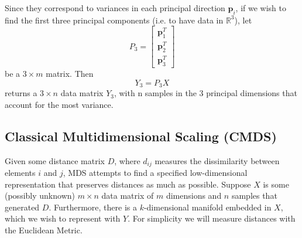 \documentclass[11pt]{article}
\begin{document}
\begin{multicols}{2}
Since they correspond to variances in each principal direction $\mathbf{p}_i$, if we wish to find the first three principal components (i.e. to have data in $\mathbb{R}^3$), let
\[P_3 = \begin{bmatrix} \mathbf{p}_1^T \\[0.5em] \mathbf{p}_2^T \\[0.5em] \mathbf{p}_3^T \end{bmatrix}\]
be a $3 \times m$ matrix. Then
\[Y_3 = P_3X\]
returns a $3 \times n$ data matrix $Y_3$, with n samples in the 3 principal dimensions that account for the most variance.

\subsection*{Classical Multidimensional Scaling (CMDS)}

Given some distance matrix $D$, where $d_{ij}$ measures the dissimilarity between elements $i$ and $j$, MDS attempts to find a specified low-dimensional representation that preserves distances as much as possible. Suppose $X$ is some (possibly unknown) $m \times n$ data matrix of $m$ dimensions and $n$ samples that generated $D$. Furthermore, there is a $k$-dimensional manifold embedded in $X$, which we wish to represent with $Y$. For simplicity we will measure distances with the Euclidean Metric.


\end{multicols}
\end{document}
